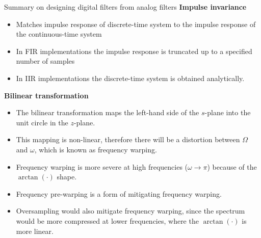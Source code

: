 \documentclass[10pt, handout]{beamer}
\begin{document}
\begin{frame}{Summary on designing digital filters from analog filters}
\textbf{Impulse invariance}
\begin{itemize}
	\item Matches impulse response of discrete-time system to the impulse response of the continuous-time system
	\item In FIR implementations the impulse response is truncated up to a specified number of samples
	\item In IIR implementations the discrete-time system is obtained analytically.
\end{itemize}

\textbf{Bilinear transformation}
	\begin{itemize}
		\item The bilinear transformation maps the left-hand side of the $s$-plane into the unit circle in the $z$-plane.
		\item This mapping is non-linear, therefore there will be a distortion between $\Omega$ and $\omega$, which is known as frequency warping.
		\item Frequency warping is more severe at high frequencies ($\omega\to\pi$) because of the $\arctan(\cdot)$ shape. 
		\item Frequency pre-warping is a form of mitigating frequency warping. 
		\item Oversampling would also mitigate frequency warping, since the spectrum would be more compressed at lower frequencies, where the $\arctan(\cdot)$ is more linear.
	\end{itemize}
\end{frame}
\end{document}
